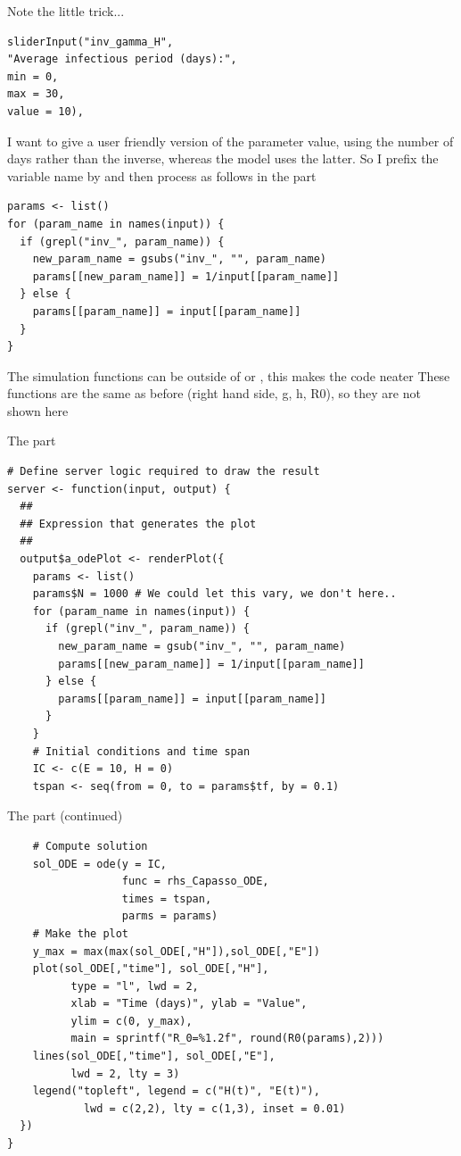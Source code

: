 \documentclass[aspectratio=169]{beamer}
\begin{document}
\begin{frame}[fragile]{Note the little trick...}
\begin{lstlisting}
sliderInput("inv_gamma_H",
"Average infectious period (days):",
min = 0,
max = 30,
value = 10),
\end{lstlisting}
\vfill
I want to give a user friendly version of the parameter value, using the number of days rather than the inverse, whereas the model uses the latter. So I prefix the variable name by  and then process as follows in the  part
\begin{lstlisting}
params <- list()
for (param_name in names(input)) {
  if (grepl("inv_", param_name)) {
    new_param_name = gsubs("inv_", "", param_name)
    params[[new_param_name]] = 1/input[[param_name]]
  } else {
    params[[param_name]] = input[[param_name]]
  }
}
\end{lstlisting}
\end{frame}

\begin{frame}
  The simulation functions can be outside of  or , this makes the code neater
  \vfill
  These functions are the same as before (right hand side, g, h, R0), so they are not shown here
\end{frame}
    

\begin{frame}[fragile]{The  part}
\begin{lstlisting}
# Define server logic required to draw the result
server <- function(input, output) {
  ##
  ## Expression that generates the plot
  ##
  output$a_odePlot <- renderPlot({
    params <- list()
    params$N = 1000 # We could let this vary, we don't here..
    for (param_name in names(input)) {
      if (grepl("inv_", param_name)) {
        new_param_name = gsub("inv_", "", param_name)
        params[[new_param_name]] = 1/input[[param_name]]
      } else {
        params[[param_name]] = input[[param_name]]
      }
    }
    # Initial conditions and time span
    IC <- c(E = 10, H = 0)
    tspan <- seq(from = 0, to = params$tf, by = 0.1)  
\end{lstlisting}
\end{frame}
  

\begin{frame}[fragile]{The  part (continued)}
\begin{lstlisting}
    # Compute solution
    sol_ODE = ode(y = IC,
                  func = rhs_Capasso_ODE,
                  times = tspan,
                  parms = params)
    # Make the plot
    y_max = max(max(sol_ODE[,"H"]),sol_ODE[,"E"])
    plot(sol_ODE[,"time"], sol_ODE[,"H"],
          type = "l", lwd = 2,
          xlab = "Time (days)", ylab = "Value",
          ylim = c(0, y_max),
          main = sprintf("R_0=%1.2f", round(R0(params),2)))
    lines(sol_ODE[,"time"], sol_ODE[,"E"], 
          lwd = 2, lty = 3)
    legend("topleft", legend = c("H(t)", "E(t)"),
            lwd = c(2,2), lty = c(1,3), inset = 0.01)
  })
}
\end{lstlisting}
\end{frame}
\end{document}
